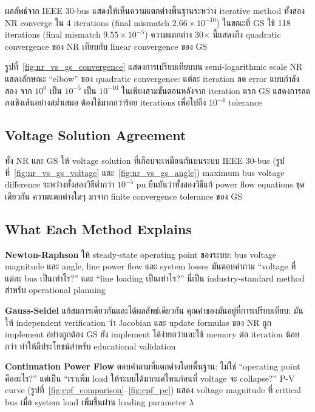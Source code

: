 \documentclass[12pt,a4paper]{article}
\begin{document}
ผลลัพธ์จาก IEEE 30-bus แสดงให้เห็นความแตกต่างพื้นฐานระหว่าง iterative method ทั้งสอง NR converge ใน 4 iterations (final mismatch $2.66\times10^{-10}$) ในขณะที่ GS ใช้ 118 iterations (final mismatch $9.55\times10^{-5}$) ความแตกต่าง 30$\times$ นี้แสดงถึง quadratic convergence ของ NR เทียบกับ linear convergence ของ GS

รูปที่~\ref{fig:nr_vs_gs_convergence} แสดงการเปรียบเทียบบน semi-logarithmic scale NR แสดงลักษณะ ``elbow'' ของ quadratic convergence: แต่ละ iteration ลด error แบบกำลังสอง จาก $10^{0}$ เป็น $10^{-5}$ เป็น $10^{-10}$ ในเพียงสามขั้นตอนหลังจาก iteration แรก GS แสดงการลดลงเชิงเส้นอย่างสม่ำเสมอ ต้องใช้มากกว่าร้อย iterations เพื่อไปถึง $10^{-4}$ tolerance

\subsection{Voltage Solution Agreement}

ทั้ง NR และ GS ให้ voltage solution ที่เกือบจะเหมือนกันบนระบบ IEEE 30-bus (รูปที่~\ref{fig:nr_vs_gs_voltage} และ~\ref{fig:nr_vs_gs_angle}) maximum bus voltage difference ระหว่างทั้งสองวิธีต่ำกว่า $10^{-5}$ pu ยืนยันว่าทั้งสองวิธีแก้ power flow equations ชุดเดียวกัน ความแตกต่างใดๆ มาจาก finite convergence tolerance ของ GS

\subsection{What Each Method Explains}

\textbf{Newton-Raphson} ให้ steady-state operating point ของระบบ: bus voltage magnitude และ angle, line power flow และ system losses มันตอบคำถาม ``voltage ที่แต่ละ bus เป็นเท่าไร?'' และ ``line loading เป็นเท่าไร?'' นี่เป็น industry-standard method สำหรับ operational planning

\textbf{Gauss-Seidel} แก้สมการเดียวกันและได้ผลลัพธ์เดียวกัน คุณค่าของมันอยู่ที่การเปรียบเทียบ: มันให้ independent verification ว่า Jacobian และ update formulas ของ NR ถูก implement อย่างถูกต้อง GS ยัง implement ได้ง่ายกว่าและใช้ memory ต่อ iteration น้อยกว่า ทำให้มีประโยชน์สำหรับ educational validation

\textbf{Continuation Power Flow} ตอบคำถามที่แตกต่างโดยพื้นฐาน: ไม่ใช่ ``operating point คืออะไร?'' แต่เป็น ``เราเพิ่ม load ให้ระบบได้มากแค่ไหนก่อนที่ voltage จะ collapse?'' P-V curve (รูปที่~\ref{fig:cpf_comparison}--\ref{fig:cpf_pc}) แสดง voltage magnitude ที่ critical bus เมื่อ system load เพิ่มขึ้นผ่าน loading parameter $\lambda$
\end{document}
